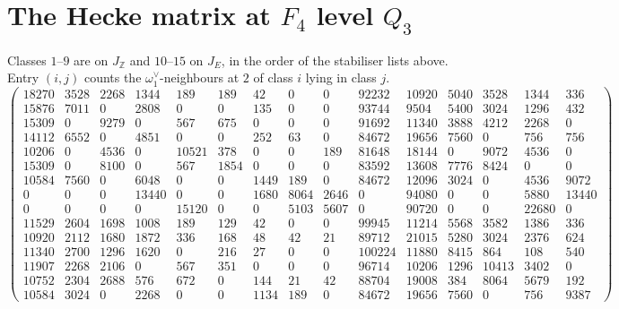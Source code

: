 \documentclass[11pt]{amsart}
\theoremstyle{definition}
\newcommand{\Z}{\mathbb{Z}}\newcommand{\Q}{\mathbb{Q}}\newcommand{\R}{\mathbb{R}}\newcommand{\A}{\mathbb{A}}\newcommand{\F}{\mathbb{F}}
\begin{document}
\section{The Hecke matrix at $F_4$ level $Q_3$}\label{app:matrix}
Classes $1$--$9$ are on $J_\Z$ and $10$--$15$ on $J_E$, in the order of the stabiliser lists above. Entry $(i,j)$ counts the $\omega_1^\vee$-neighbours at $2$ of class $i$ lying in class $j$.
{\tiny\[\left(\begin{array}{rrrrrrrrrrrrrrr}
18270&3528&2268&1344&189&189&42&0&0&92232&10920&5040&3528&1344&336\\
15876&7011&0&2808&0&0&135&0&0&93744&9504&5400&3024&1296&432\\
15309&0&9279&0&567&675&0&0&0&91692&11340&3888&4212&2268&0\\
14112&6552&0&4851&0&0&252&63&0&84672&19656&7560&0&756&756\\
10206&0&4536&0&10521&378&0&0&189&81648&18144&0&9072&4536&0\\
15309&0&8100&0&567&1854&0&0&0&83592&13608&7776&8424&0&0\\
10584&7560&0&6048&0&0&1449&189&0&84672&12096&3024&0&4536&9072\\
0&0&0&13440&0&0&1680&8064&2646&0&94080&0&0&5880&13440\\
0&0&0&0&15120&0&0&5103&5607&0&90720&0&0&22680&0\\
11529&2604&1698&1008&189&129&42&0&0&99945&11214&5568&3582&1386&336\\
10920&2112&1680&1872&336&168&48&42&21&89712&21015&5280&3024&2376&624\\
11340&2700&1296&1620&0&216&27&0&0&100224&11880&8415&864&108&540\\
11907&2268&2106&0&567&351&0&0&0&96714&10206&1296&10413&3402&0\\
10752&2304&2688&576&672&0&144&21&42&88704&19008&384&8064&5679&192\\
10584&3024&0&2268&0&0&1134&189&0&84672&19656&7560&0&756&9387
\end{array}\right)\]}
\end{document}

